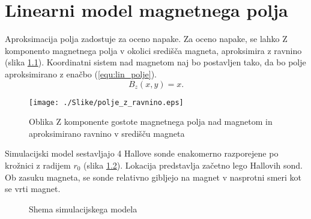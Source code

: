 \chapter{Linearni model magnetnega polja}
\label{linearnimodel}

Aproksimacija polja zadostuje za oceno napake.
Za oceno napake, se lahko Z komponento magnetnega polja v okolici središča magneta, aproksimira z ravnino (slika \ref{polje_z_ravnino}).
Koordinatni sistem nad magnetom naj bo postavljen tako, da bo polje aproksimirano z enačbo (\ref{equ:lin_polje}).
\begin{equation}
\label{equ:lin_polje}
B_z(x,y)= x.
\end{equation}
\begin{figure}[ht]
	\centering
	\texttt{[image: ./Slike/polje\_z\_ravnino.eps]}
	\caption{Oblika Z komponente gostote magnetnega polja nad magnetom in aproksimirano ravnino v središču magneta}
	\label{polje_z_ravnino}
\end{figure}
\newpage

Simulacijski model sestavljajo 4 Hallove sonde enakomerno razporejene po krožnici z radijem $r_0$ (slika \ref{lin_simul}). Lokacija predstavlja začetno lego Hallovih sond. 
Ob zasuku magneta, se sonde relativno gibljejo na magnet v nasprotni smeri kot se vrti magnet. 
\begin{figure}[!ht]
	\centering
	\caption{Shema simulacijskega modela}
	\label{lin_simul}
\end{figure}

